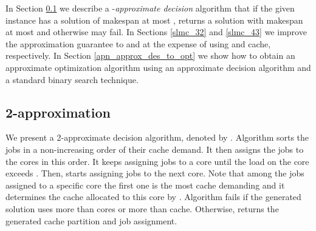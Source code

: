\documentclass[11pt]{article}
\begin{document}
In Section \ref{slmc_2} we describe a -\textit{approximate decision} algorithm that if the given instance has a solution of makespan at most , returns a solution with makespan at most  and otherwise may fail. In Sections \ref{slmc_32} and \ref{slmc_43}  we improve the approximation guarantee to  and  at the expense of using  and  cache, respectively.
In Section \ref{apn_approx_des_to_opt} we show how to obtain an approximate optimization algorithm using an approximate decision algorithm and a standard binary search technique.

\subsection{2-approximation}\label{slmc_2}
We present a 2-approximate decision algorithm, denoted by .
Algorithm  sorts the jobs in a non-increasing order of their cache
demand. It then assigns the jobs to the cores in this order. It
keeps assigning jobs to a core until the load on the core exceeds
. Then,  starts assigning jobs to the next core.
Note that among the jobs assigned to a specific core the first one is the
most cache demanding and it determines the cache allocated to this core by .
Algorithm  fails if the generated solution uses more than  cores or more than  cache.
Otherwise,  returns the generated cache partition and job assignment.
\end{document}
